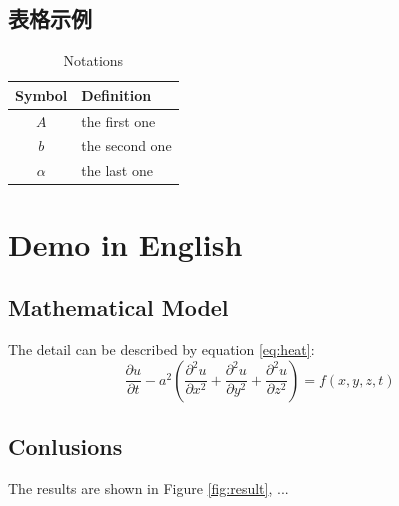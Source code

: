 \documentclass[12pt]{article}  %
\begin{document}
\subsection{表格示例}
\begin{table}[!htbp]
\begin{center}
\caption{Notations}
\begin{tabular}{cl}
	\toprule
	\multicolumn{1}{m{3cm}}{\centering Symbol}
	&\multicolumn{1}{m{8cm}}{\centering Definition}\\
	\midrule
	$A$&the first one\\
	$b$&the second one\\
	$\alpha$ &the last one\\
	\bottomrule
\end{tabular}\label{tb:notation}
\end{center}
\end{table}


\section{Demo in English}
\subsection{Mathematical Model}
The detail can be described by equation \eqref{eq:heat}:
\begin{equation}\label{eq:heat}
\frac{\partial u}{\partial t} - a^2 \left( \frac{\partial^2 u}{\partial x^2} + \frac{\partial^2 u}{\partial y^2} + \frac{\partial^2 u}{\partial z^2} \right) = f(x, y, z, t)
\end{equation}

\subsection{Conlusions}
The results are shown in Figure \ref{fig:result}, ... 


\end{document}
